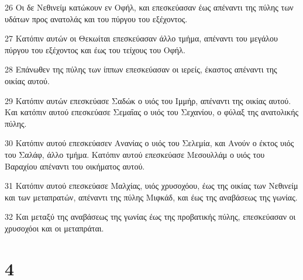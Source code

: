 \par 26 Οι δε Νεθινείμ κατώκουν εν Οφήλ, και επεσκεύασαν έως απέναντι της πύλης των υδάτων προς ανατολάς και του πύργου του εξέχοντος.
\par 27 Κατόπιν αυτών οι Θεκωίται επεσκεύασαν άλλο τμήμα, απέναντι του μεγάλου πύργου του εξέχοντος και έως του τείχους του Οφήλ.
\par 28 Επάνωθεν της πύλης των ίππων επεσκεύασαν οι ιερείς, έκαστος απέναντι της οικίας αυτού.
\par 29 Κατόπιν αυτών επεσκεύασε Σαδώκ ο υιός του Ιμμήρ, απέναντι της οικίας αυτού. Και κατόπιν αυτού επεσκεύασε Σεμαΐας ο υιός του Σεχανίου, ο φύλαξ της ανατολικής πύλης.
\par 30 Κατόπιν αυτού επεσκεύασεν Ανανίας ο υιός του Σελεμία, και Ανούν ο έκτος υιός του Σαλάφ, άλλο τμήμα. Κατόπιν αυτού επεσκεύασε Μεσουλλάμ ο υιός του Βαραχίου απέναντι του οικήματος αυτού.
\par 31 Κατόπιν αυτού επεσκεύασε Μαλχίας, υιός χρυσοχόου, έως της οικίας των Νεθινείμ και των μεταπρατών, απέναντι της πύλης Μιφκάδ, και έως της αναβάσεως της γωνίας.
\par 32 Και μεταξύ της αναβάσεως της γωνίας έως της προβατικής πύλης, επεσκεύασαν οι χρυσοχόοι και οι μεταπράται.

\chapter{4}


